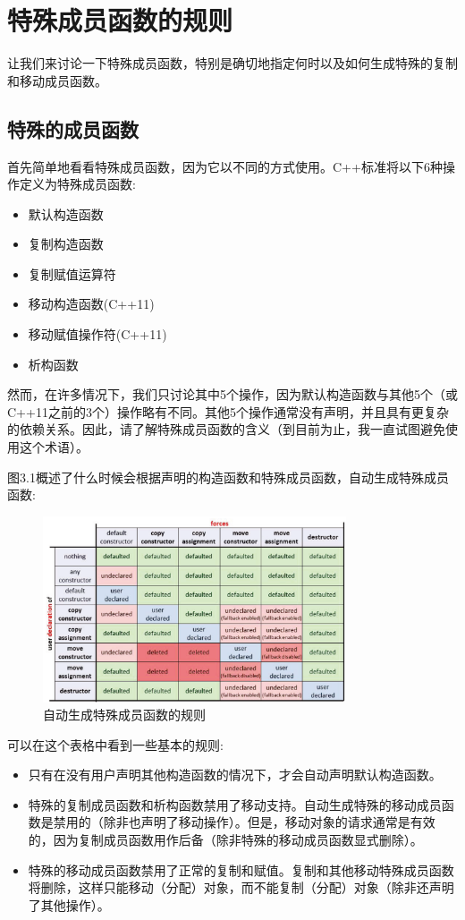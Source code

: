 \section{特殊成员函数的规则}
让我们来讨论一下特殊成员函数，特别是确切地指定何时以及如何生成特殊的复制和移动成员函数。

\subsection{特殊的成员函数}

首先简单地看看特殊成员函数，因为它以不同的方式使用。C++标准将以下6种操作定义为特殊成员函数:

\begin{itemize}
	\item 默认构造函数
	\item 复制构造函数
	\item 复制赋值运算符
	\item 移动构造函数(C++11)
	\item 移动赋值操作符(C++11)
	\item 析构函数
\end{itemize}

然而，在许多情况下，我们只讨论其中5个操作，因为默认构造函数与其他5个（或C++11之前的3个）操作略有不同。其他5个操作通常没有声明，并且具有更复杂的依赖关系。因此，请了解特殊成员函数的含义（到目前为止，我一直试图避免使用这个术语）。

图3.1概述了什么时候会根据声明的构造函数和特殊成员函数，自动生成特殊成员函数:

\begin{figure}
	\includegraphics[width=0.8\textwidth]{part1/ch3/images/1}
	\caption{自动生成特殊成员函数的规则}
\end{figure}


可以在这个表格中看到一些基本的规则:

\begin{itemize}
	\item 只有在没有用户声明其他构造函数的情况下，才会自动声明默认构造函数。
	\item 特殊的复制成员函数和析构函数禁用了移动支持。自动生成特殊的移动成员函数是禁用的（除非也声明了移动操作）。但是，移动对象的请求通常是有效的，因为复制成员函数用作后备（除非特殊的移动成员函数显式删除）。
	\item 特殊的移动成员函数禁用了正常的复制和赋值。复制和其他移动特殊成员函数将删除，这样只能移动（分配）对象，而不能复制（分配）对象（除非还声明了其他操作）。
\end{itemize}

